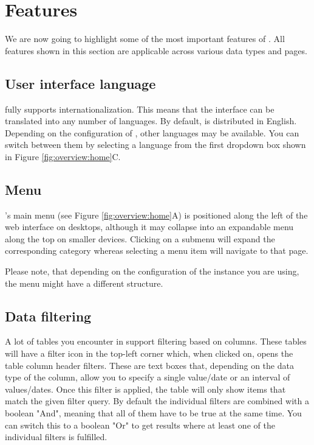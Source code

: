 \section{Features}
We are now going to highlight some of the most important features of {\germinate}. All features shown in this section are applicable across various data types and pages.

\subsection{User interface language}
\label{sec:features:language-selector}
{\germinate} fully supports internationalization. This means that the interface can be translated into any number of languages. By default, {\germinate} is distributed in English. Depending on the configuration of {\germinate}, other languages may be available. You can switch between them by selecting a language from the first dropdown box shown in Figure \ref{fig:overview:home}C.

\subsection{Menu}
\label{sec:features:menu}
{\germinate}'s main menu (see Figure \ref{fig:overview:home}A) is positioned along the left of the web interface on desktops, although it may collapse into an expandable menu along the top on smaller devices. Clicking on a submenu will expand the corresponding category whereas selecting a menu item will navigate to that page.

Please note, that depending on the configuration of the {\germinate} instance you are using, the menu might have a different structure.

\subsection{Data filtering}
\label{sec:features:filtering}
A lot of tables you encounter in {\germinate} support filtering based on columns. These tables will have a filter icon in the top-left corner which, when clicked on, opens the table column header filters. These are text boxes that, depending on the data type of the column, allow you to specify a single value/date or an interval of values/dates. Once this filter is applied, the table will only show items that match the given filter query. By default the individual filters are combined with a boolean "And", meaning that all of them have to be true at the same time. You can switch this to a boolean "Or" to get results where at least one of the individual filters is fulfilled.

